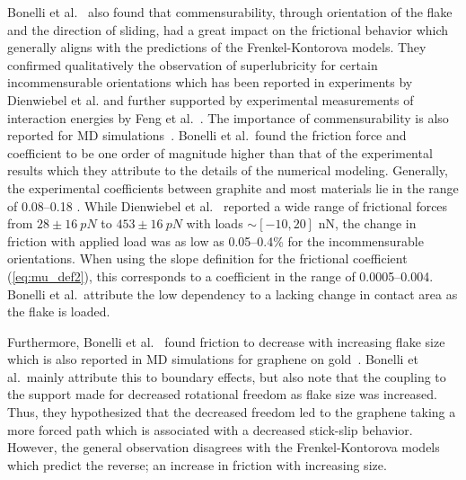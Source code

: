 Bonelli et al.~\cite{bonelli_atomistic_2009} also found that commensurability,
through orientation of the flake and the direction of sliding, had a great
impact on the frictional behavior which generally aligns with the predictions of
the Frenkel-Kontorova models. They confirmed qualitatively the
observation of superlubricity for certain incommensurable orientations which has
been reported in experiments by Dienwiebel et al.\cite{DIENWIEBEL2005197} and
further supported by experimental measurements of interaction energies by Feng
et al.~\cite{feng_superlubric_2013}. The importance of commensurability is also
reported for \acrshort{MD} simulations~\cite{ma12091425, zhu_study_2018,
Wijn_2011}. Bonelli et al.\ found the friction force and coefficient to be one
order of magnitude higher than that of the experimental results which they
attribute to the details of the numerical modeling. Generally, the experimental
coefficients between graphite and most materials lie in the range of 0.08--0.18
\cite{DIENWIEBEL2005197}. While Dienwiebel et al.~\cite{DIENWIEBEL2005197}
reported a wide range of frictional forces from $28 \pm \SI{16}{pN}$ to $453 \pm \SI{16}{pN}$ with loads $\sim [-10, 20]$ nN, the change in friction with applied load was
as low as 0.05--0.4\% for the incommensurable orientations. When using the slope definition for the frictional coefficient (\cref{eq:mu_def2}), this corresponds to a coefficient in the range of 0.0005--0.004. Bonelli et al.\ attribute the low dependency to a lacking change in contact area as the flake is loaded. 

Furthermore, Bonelli et al.~\cite{bonelli_atomistic_2009} found friction to
decrease with increasing flake size which is also reported in \acrshort{MD}
simulations for graphene on gold~\cite{zhu_study_2018}. Bonelli et al.\ mainly
attribute this to boundary effects, but also note that the coupling to the
support made for decreased rotational freedom as flake size was increased. Thus,
they hypothesized that the decreased freedom led to the graphene taking a more
forced path which is associated with a decreased stick-slip behavior. However, the
general observation disagrees with the Frenkel-Kontorova
models which predict the reverse; an increase in friction with increasing size. 

